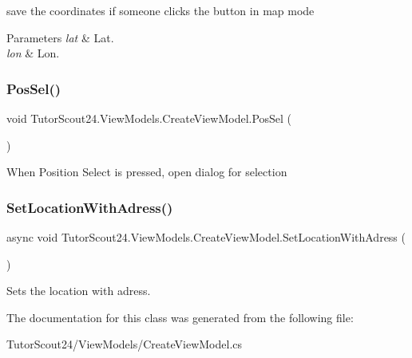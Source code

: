 save the coordinates if someone clicks the button in map mode 


\begin{DoxyParams}{Parameters}
{\em lat} & Lat.\\
\hline
{\em lon} & Lon.\\
\hline
\end{DoxyParams}
\mbox{\label{class_tutor_scout24_1_1_view_models_1_1_create_view_model_a5002145ea2bc96424f202caee461f810}} 
\subsubsection{\texorpdfstring{Pos\+Sel()}{PosSel()}}
{\footnotesize\ttfamily void Tutor\+Scout24.\+View\+Models.\+Create\+View\+Model.\+Pos\+Sel (\begin{DoxyParamCaption}{ }\end{DoxyParamCaption})\hspace{0.3cm}{\ttfamily [inline]}}



When Position Select is pressed, open dialog for selection 

\mbox{\label{class_tutor_scout24_1_1_view_models_1_1_create_view_model_ad2021b575ac16ac9877b1b29e2fe8e6a}} 
\subsubsection{\texorpdfstring{Set\+Location\+With\+Adress()}{SetLocationWithAdress()}}
{\footnotesize\ttfamily async void Tutor\+Scout24.\+View\+Models.\+Create\+View\+Model.\+Set\+Location\+With\+Adress (\begin{DoxyParamCaption}{ }\end{DoxyParamCaption})\hspace{0.3cm}{\ttfamily [inline]}}



Sets the location with adress. 



The documentation for this class was generated from the following file\+:\begin{DoxyCompactItemize}
\item 
Tutor\+Scout24/\+View\+Models/Create\+View\+Model.\+cs\end{DoxyCompactItemize}
